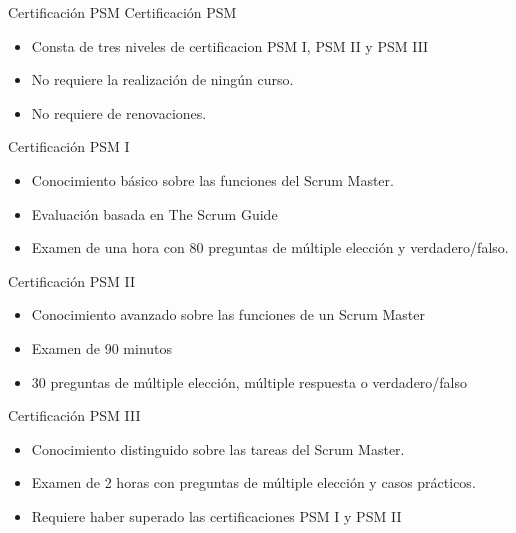\begin{frame}[allowframebreaks]{Certificación PSM}
	Certificación PSM 

	\begin{itemize}
		\item Consta de tres niveles de certificacion PSM I, PSM II y PSM III
		\item No requiere la realización de ningún curso.
		\item No requiere de renovaciones.
	\end{itemize}

	\framebreak

	Certificación PSM I
	\begin{itemize}
		\item Conocimiento básico sobre las funciones del Scrum Master.
		\item Evaluación basada en The Scrum Guide
		\item Examen de una hora con 80 preguntas de múltiple elección y verdadero/falso.
	\end{itemize}

	\framebreak

	Certificación PSM II
	\begin{itemize}
		\item Conocimiento avanzado sobre las funciones de un Scrum Master
		\item Examen de 90 minutos
		\item 30 preguntas de múltiple elección, múltiple respuesta o verdadero/falso
	\end{itemize}

	\framebreak

	Certificación PSM III
	\begin{itemize}
		\item Conocimiento distinguido sobre las tareas del Scrum Master.
		\item Examen de 2 horas con preguntas de múltiple elección y casos prácticos.
		\item Requiere haber superado las certificaciones PSM I y PSM II
	\end{itemize}


\end{frame}